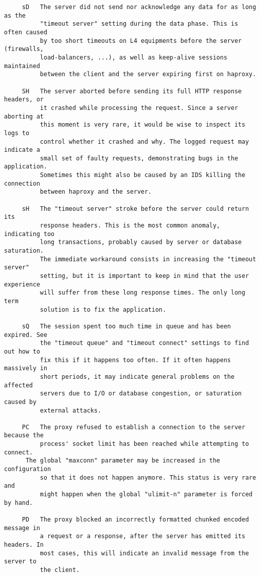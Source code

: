 \begin{verbatim}
     sD   The server did not send nor acknowledge any data for as long as the
          "timeout server" setting during the data phase. This is often caused
          by too short timeouts on L4 equipments before the server (firewalls,
          load-balancers, ...), as well as keep-alive sessions maintained
          between the client and the server expiring first on haproxy.

     SH   The server aborted before sending its full HTTP response headers, or
          it crashed while processing the request. Since a server aborting at
          this moment is very rare, it would be wise to inspect its logs to
          control whether it crashed and why. The logged request may indicate a
          small set of faulty requests, demonstrating bugs in the application.
          Sometimes this might also be caused by an IDS killing the connection
          between haproxy and the server.

     sH   The "timeout server" stroke before the server could return its
          response headers. This is the most common anomaly, indicating too
          long transactions, probably caused by server or database saturation.
          The immediate workaround consists in increasing the "timeout server"
          setting, but it is important to keep in mind that the user experience
          will suffer from these long response times. The only long term
          solution is to fix the application.

     sQ   The session spent too much time in queue and has been expired. See
          the "timeout queue" and "timeout connect" settings to find out how to
          fix this if it happens too often. If it often happens massively in
          short periods, it may indicate general problems on the affected
          servers due to I/O or database congestion, or saturation caused by
          external attacks.

     PC   The proxy refused to establish a connection to the server because the
          process' socket limit has been reached while attempting to connect.
	  The global "maxconn" parameter may be increased in the configuration
          so that it does not happen anymore. This status is very rare and
          might happen when the global "ulimit-n" parameter is forced by hand.

     PD   The proxy blocked an incorrectly formatted chunked encoded message in
          a request or a response, after the server has emitted its headers. In
          most cases, this will indicate an invalid message from the server to
          the client.


\end{verbatim}
